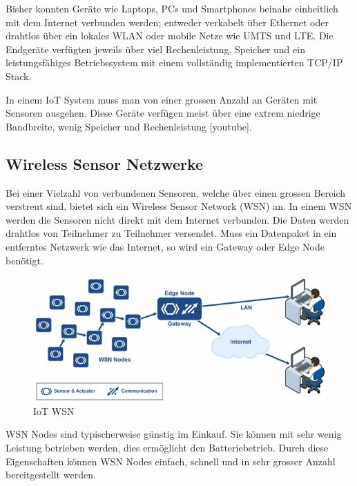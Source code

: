 Bisher konnten Geräte wie Laptops, PCs und Smartphones beinahe einheitlich mit dem Internet verbunden werden; entweder verkabelt über Ethernet oder drahtlos über ein lokales WLAN oder mobile Netze wie UMTS und LTE. Die Endgeräte verfügten jeweils über viel Rechenleistung, Speicher und ein leistungsfähiges Betriebssystem mit einem vollständig implementierten TCP/IP Stack. 

In einem IoT System muss man von einer grossen Anzahl an Geräten mit Sensoren ausgehen. Diese Geräte verfügen meist über eine extrem niedrige Bandbreite, wenig Speicher und Rechenleistung [youtube].
\subsection{Wireless Sensor Netzwerke}
Bei einer Vielzahl von verbundenen Sensoren, welche über einen grossen Bereich verstreut sind, bietet sich ein Wireless Sensor Network (WSN) an. In einem WSN werden die Sensoren nicht direkt mit dem Internet verbunden. Die Daten werden drahtlos von Teilnehmer zu Teilnehmer versendet. Muss ein Datenpaket in ein entferntes Netzwerk wie das Internet, so wird ein Gateway oder Edge Node benötigt.
\begin{figure}[H]
\centering
\includegraphics[scale=0.8]{images/iot_wsn_lan_overview_by_micrium.PNG}
\caption{IoT WSN\cite{IoTWSN}}
\end{figure}
WSN Nodes sind typischerweise günstig im Einkauf. Sie können mit sehr wenig Leistung betrieben werden, dies ermöglicht den Batteriebetrieb. Durch diese Eigenschaften können WSN Nodes einfach, schnell und in sehr grosser Anzahl bereitgestellt werden. 